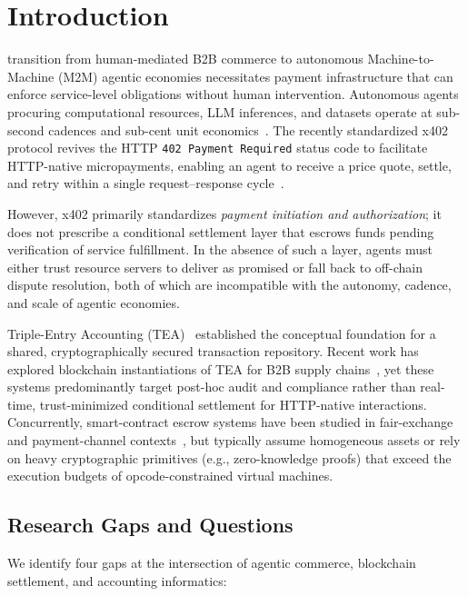 \documentclass[journal]{IEEEtran}
\begin{document}
\section{Introduction}
 transition from human-mediated B2B commerce to autonomous Machine-to-Machine (M2M) agentic economies necessitates payment infrastructure that can enforce service-level obligations without human intervention. Autonomous agents procuring computational resources, LLM inferences, and datasets operate at sub-second cadences and sub-cent unit economics~\cite{x402spec}. The recently standardized x402 protocol revives the HTTP \texttt{402 Payment Required} status code to facilitate HTTP-native micropayments, enabling an agent to receive a price quote, settle, and retry within a single request--response cycle~\cite{x402spec,x402facilitator}.

However, x402 primarily standardizes \emph{payment initiation and authorization}; it does not prescribe a conditional settlement layer that escrows funds pending verification of service fulfillment. In the absence of such a layer, agents must either trust resource servers to deliver as promised or fall back to off-chain dispute resolution, both of which are incompatible with the autonomy, cadence, and scale of agentic economies.

Triple-Entry Accounting (TEA)~\cite{grigg2005,boyle2001} established the conceptual foundation for a shared, cryptographically secured transaction repository. Recent work has explored blockchain instantiations of TEA for B2B supply chains~\cite{ibanez2023,sarwar2023}, yet these systems predominantly target post-hoc audit and compliance rather than real-time, trust-minimized conditional settlement for HTTP-native interactions. Concurrently, smart-contract escrow systems have been studied in fair-exchange and payment-channel contexts~\cite{asokan2004,pagnia2003}, but typically assume homogeneous assets or rely on heavy cryptographic primitives (e.g., zero-knowledge proofs) that exceed the execution budgets of opcode-constrained virtual machines.

\subsection{Research Gaps and Questions}
We identify four gaps at the intersection of agentic commerce, blockchain settlement, and accounting informatics:
\end{document}
